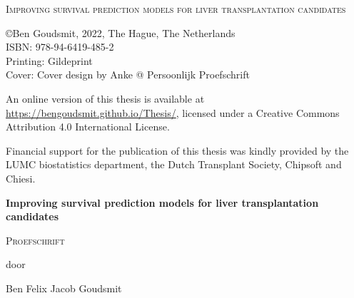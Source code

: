 \documentclass[11pt,english,]{book} %
\begin{document}
 

\frontmatter
\thispagestyle{empty}
\def\drop{.1\textheight}

\vspace*{\drop}
\begin{center}
\Huge \textsc{Improving survival prediction models for liver transplantation candidates}
\end{center}

\clearpage
\thispagestyle{empty}
\vspace*{\fill}
\begingroup %
\small
\setlength{\parskip}{\baselineskip} %
\setlength\parindent{0pt} %
\copyright  Ben Goudsmit, 2022, The Hague, The Netherlands
\\ ISBN: 978-94-6419-485-2\\ Printing: Gildeprint\\ Cover: Cover design by Anke @ Persoonlijk Proefschrift

An online version of this thesis is available at \url{https://bengoudsmit.github.io/Thesis/}, 
licensed under a Creative Commons Attribution 4.0 International License.


Financial support for the publication of this thesis was kindly provided by  the LUMC biostatistics department, the Dutch Transplant Society, Chipsoft and Chiesi.
\endgroup

\clearpage
\thispagestyle{empty}
\vspace*{\drop}
\begin{center}
\Huge\textbf{Improving survival prediction models for liver transplantation candidates}\par
\vfill %
\large \textsc{ Proefschrift}\par
\vspace{\baselineskip}
\par %
\vspace{\baselineskip}
{\large door}\par
\vspace{\baselineskip}
{\Large Ben Felix Jacob Goudsmit}\par
\vspace{\baselineskip}
\end{center}
\end{document}
